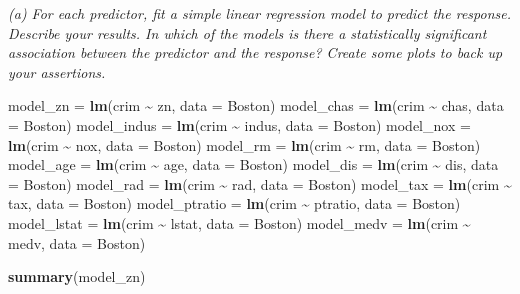 \documentclass[
]{article}
\newenvironment{Shaded}{\begin{snugshade}}{\end{snugshade}}
\newcommand{\AttributeTok}[1]{\textcolor[rgb]{0.13,0.29,0.53}{#1}}
\newcommand{\FunctionTok}[1]{\textcolor[rgb]{0.13,0.29,0.53}{\textbf{#1}}}
\newcommand{\NormalTok}[1]{#1}
\newcommand{\OtherTok}[1]{\textcolor[rgb]{0.56,0.35,0.01}{#1}}
\newcommand{\SpecialCharTok}[1]{\textcolor[rgb]{0.81,0.36,0.00}{\textbf{#1}}}
\begin{document}
\emph{(a) For each predictor, fit a simple linear regression model to
predict the response. Describe your results. In which of the models is
there a statistically significant association between the predictor and
the response? Create some plots to back up your assertions.}

\begin{Shaded}
\begin{Highlighting}[]
\NormalTok{model\_zn }\OtherTok{=} \FunctionTok{lm}\NormalTok{(crim }\SpecialCharTok{\textasciitilde{}}\NormalTok{ zn, }\AttributeTok{data =}\NormalTok{ Boston)}
\NormalTok{model\_chas }\OtherTok{=} \FunctionTok{lm}\NormalTok{(crim }\SpecialCharTok{\textasciitilde{}}\NormalTok{ chas, }\AttributeTok{data =}\NormalTok{ Boston)}
\NormalTok{model\_indus }\OtherTok{=} \FunctionTok{lm}\NormalTok{(crim }\SpecialCharTok{\textasciitilde{}}\NormalTok{ indus, }\AttributeTok{data =}\NormalTok{ Boston)}
\NormalTok{model\_nox }\OtherTok{=} \FunctionTok{lm}\NormalTok{(crim }\SpecialCharTok{\textasciitilde{}}\NormalTok{ nox, }\AttributeTok{data =}\NormalTok{ Boston)}
\NormalTok{model\_rm }\OtherTok{=} \FunctionTok{lm}\NormalTok{(crim }\SpecialCharTok{\textasciitilde{}}\NormalTok{ rm, }\AttributeTok{data =}\NormalTok{ Boston)}
\NormalTok{model\_age }\OtherTok{=} \FunctionTok{lm}\NormalTok{(crim }\SpecialCharTok{\textasciitilde{}}\NormalTok{ age, }\AttributeTok{data =}\NormalTok{ Boston)}
\NormalTok{model\_dis }\OtherTok{=} \FunctionTok{lm}\NormalTok{(crim }\SpecialCharTok{\textasciitilde{}}\NormalTok{ dis, }\AttributeTok{data =}\NormalTok{ Boston)}
\NormalTok{model\_rad }\OtherTok{=} \FunctionTok{lm}\NormalTok{(crim }\SpecialCharTok{\textasciitilde{}}\NormalTok{ rad, }\AttributeTok{data =}\NormalTok{ Boston)}
\NormalTok{model\_tax }\OtherTok{=} \FunctionTok{lm}\NormalTok{(crim }\SpecialCharTok{\textasciitilde{}}\NormalTok{ tax, }\AttributeTok{data =}\NormalTok{ Boston)}
\NormalTok{model\_ptratio }\OtherTok{=} \FunctionTok{lm}\NormalTok{(crim }\SpecialCharTok{\textasciitilde{}}\NormalTok{ ptratio, }\AttributeTok{data =}\NormalTok{ Boston)}
\NormalTok{model\_lstat }\OtherTok{=} \FunctionTok{lm}\NormalTok{(crim }\SpecialCharTok{\textasciitilde{}}\NormalTok{ lstat, }\AttributeTok{data =}\NormalTok{ Boston)}
\NormalTok{model\_medv }\OtherTok{=} \FunctionTok{lm}\NormalTok{(crim }\SpecialCharTok{\textasciitilde{}}\NormalTok{ medv, }\AttributeTok{data =}\NormalTok{ Boston)}

\FunctionTok{summary}\NormalTok{(model\_zn)}
\end{Highlighting}
\end{Shaded}
\end{document}
